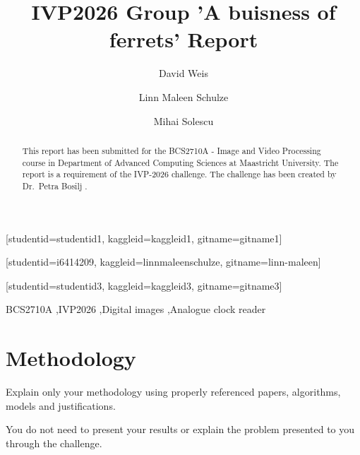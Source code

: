 \documentclass[a4paper,fleqn]{cas-sc}
\begin{document}
\graphicspath{{./}}


\title [mode = title]{IVP2026 Group 'A buisness of ferrets' Report}

\author[1]{David Weis}[studentid=studentid1, kaggleid=kaggleid1, gitname=gitname1]
\author[1]{Linn Maleen Schulze}[studentid=i6414209, kaggleid=linnmaleenschulze, gitname=linn-maleen]
\author[1]{Mihai Solescu}[studentid=studentid3, kaggleid=kaggleid3, gitname=gitname3]


\begin{abstract}
This report has been submitted for the BCS2710A - Image and Video Processing course in Department of Advanced Computing Sciences at Maastricht University. The report is a requirement of the IVP-2026 challenge. The challenge has been created by Dr.\@~Petra Bosilj \citep{the_challenge}.
\end{abstract}

\begin{keywords}
BCS2710A \sep IVP2026 \sep Digital images \sep Analogue clock reader 
\end{keywords}
\maketitle 
\clearpage

\section{Methodology}
Explain only your methodology using properly referenced papers, algorithms, models and justifications.

You do not need to present your results or explain the problem presented to you through the challenge.
\end{document}
